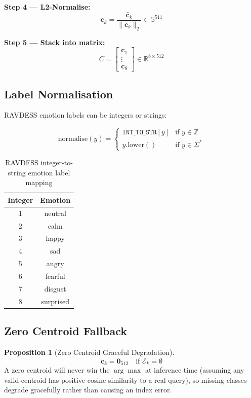 \documentclass[12pt,a4paper]{article}
\theoremstyle{definition}
\newtheorem{proposition}[theorem]{Proposition}
\theoremstyle{remark}
\begin{document}
\textbf{Step 4 — L2-Normalise:}
\[
  \mathbf{c}_k = \frac{\bar{\mathbf{c}}_k}{\|\bar{\mathbf{c}}_k\|_2}
  \in \mathbb{S}^{511}
\]

\textbf{Step 5 — Stack into matrix:}
\[
  C = \begin{bmatrix} \mathbf{c}_1 \\ \vdots \\ \mathbf{c}_8 \end{bmatrix}
  \in \mathbb{R}^{8 \times 512}
\]

\subsection{Label Normalisation}

RAVDESS emotion labels can be integers or strings:

\[
  \text{normalise}(y) = \begin{cases}
    \texttt{INT\_TO\_STR}[y] & \text{if } y \in \mathbb{Z} \\
    y.\text{lower}()         & \text{if } y \in \Sigma^*
  \end{cases}
\]

\begin{table}[H]
\centering
\caption{RAVDESS integer-to-string emotion label mapping}
\begin{tabular}{cc}
\toprule
Integer & Emotion \\
\midrule
1 & neutral \\
2 & calm \\
3 & happy \\
4 & sad \\
5 & angry \\
6 & fearful \\
7 & disgust \\
8 & surprised \\
\bottomrule
\end{tabular}
\end{table}

\subsection{Zero Centroid Fallback}

\begin{proposition}[Zero Centroid Graceful Degradation]
\[
  \mathbf{c}_k = \mathbf{0}_{512} \quad \text{if } \mathcal{E}_k = \emptyset
\]
A zero centroid will never win the $\arg\max$ at inference time
(assuming any valid centroid has positive cosine similarity to a real query),
so missing classes degrade gracefully rather than causing an index error.
\end{proposition}
\end{document}
